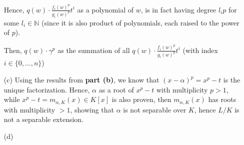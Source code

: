 \documentclass{article}
\begin{document}
\begin{itemize}
    Hence, $q(w)\cdot \frac{f_i(w)^p}{g_i(w)^p}t^i$ as a polynomial of $w$, is in fact having degree $l_ip$ for some $l_i\in\mathbb{N}$ (since it is also product of polynomials, each raised to the power of $p$).

    Then, $q(w)\cdot \gamma^p$ as the summation of all $q(w)\cdot \frac{f_i(w)^p}{g_i(w)^p}t^i$ (with index $i\in \{0,...,n\}$)

    \hfil
    
    \item[(c)] Using the results from \textbf{part (b)}, we know that $(x-\alpha)^p = x^p-t$ is the unique factorization. Hence, $\alpha$ as a root of $x^p-t$ with multiplicity $p>1$, while $x^p-t=m_{\alpha,K}(x)\in K[x]$ is also proven, then $m_{\alpha,K}(x)$ has roots with multiplicity $>1$, showing that $\alpha$ is not separable over $K$, hence $L/K$ is not a separable extension.

    \hfil

    \item[(d)]   
\end{itemize}
\end{document}
